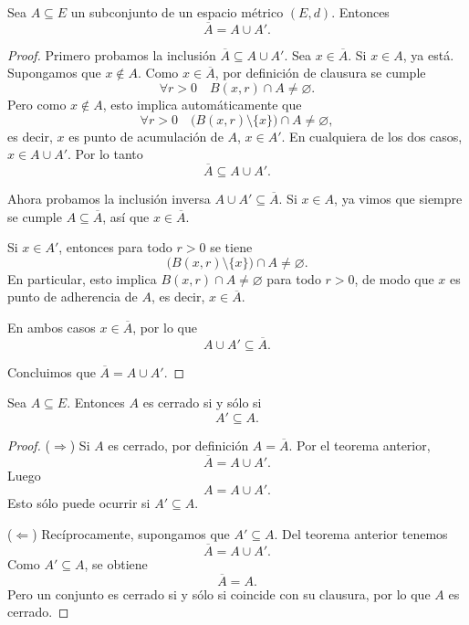 \begin{teo}
Sea $A \subseteq E$ un subconjunto de un espacio métrico $(E,d)$.
Entonces
\[
\overline{A} = A \cup A'.
\]
\end{teo}

\begin{proof}
Primero probamos la inclusión $\overline{A} \subseteq A \cup A'$.
Sea $x \in \overline{A}$. Si $x \in A$, ya está.
Supongamos que $x \notin A$. Como $x \in \overline{A}$, por definición de
clausura se cumple
\[
\forall r>0 \quad B(x,r) \cap A \neq \varnothing.
\]
Pero como $x \notin A$, esto implica automáticamente que
\[
\forall r>0 \quad \bigl(B(x,r) \setminus \{x\}\bigr) \cap A \neq \varnothing,
\]
es decir, $x$ es punto de acumulación de $A$, $x \in A'$. En cualquiera de
los dos casos, $x \in A \cup A'$. Por lo tanto
\[
\overline{A} \subseteq A \cup A'.
\]

Ahora probamos la inclusión inversa $A \cup A' \subseteq \overline{A}$.
Si $x \in A$, ya vimos que siempre se cumple $A \subseteq \overline{A}$,
así que $x \in \overline{A}$.

Si $x \in A'$, entonces para todo $r>0$ se tiene
\[
\bigl(B(x,r) \setminus \{x\}\bigr) \cap A \neq \varnothing.
\]
En particular, esto implica $B(x,r) \cap A \neq \varnothing$ para todo $r>0$,
de modo que $x$ es punto de adherencia de $A$, es decir, $x \in \overline{A}$.

En ambos casos $x \in \overline{A}$, por lo que
\[
A \cup A' \subseteq \overline{A}.
\]

Concluimos que $\overline{A} = A \cup A'$.
\end{proof}

\begin{cor}
Sea $A \subseteq E$. Entonces $A$ es cerrado si y sólo si
\[
A' \subseteq A.
\]
\end{cor}

\begin{proof}
($\Rightarrow$) Si $A$ es cerrado, por definición $A = \overline{A}$.
Por el teorema anterior,
\[
\overline{A} = A \cup A'.
\]
Luego
\[
A = A \cup A'.
\]
Esto sólo puede ocurrir si $A' \subseteq A$.

\medskip

($\Leftarrow$) Recíprocamente, supongamos que $A' \subseteq A$.
Del teorema anterior tenemos
\[
\overline{A} = A \cup A'.
\]
Como $A' \subseteq A$, se obtiene
\[
\overline{A} = A.
\]
Pero un conjunto es cerrado si y sólo si coincide con su clausura, por lo que
$A$ es cerrado.
\end{proof}


